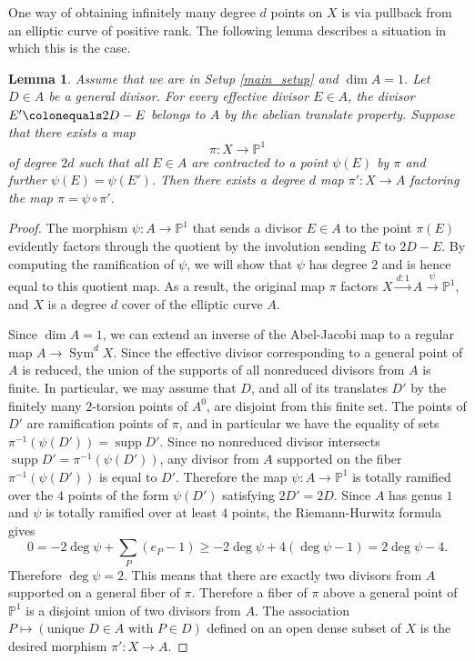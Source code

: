 \documentclass[11pt]{amsart}
\newcommand{\PP}{\mathbb{P}}
\newcommand{\pp}{\mathbb{P}}
\DeclareMathOperator{\supp}{supp}
\DeclareMathOperator{\Sym}{Sym}
\newtheorem{lemma}[theorem]{Lemma}
\theoremstyle{definition}
\theoremstyle{remark}
\begin{document}
One way of obtaining infinitely many degree \(d\) points on \(X\) is via pullback from an elliptic curve of positive rank.  The following lemma describes a situation in which this is the case.

\begin{lemma}\label{lem:ramification_argument}
Assume that we are in Setup \ref{main_setup} and \(\dim A = 1\).  Let \(D \in A\) be a general divisor.  For every effective divisor $E \in A$, the divisor $E' \colonequals 2D-E$ belongs to $A$ by the abelian translate property. Suppose that there exists a map
\[\pi \colon X \to \pp^1\]
of degree \(2d\) such that all \(E \in A\) are contracted to a point \(\psi(E)\) by \(\pi\) and further \(\psi(E) = \psi(E')\).  Then there exists a degree \(d\) map \(\pi'\colon X \to A\) factoring the map \(\pi = \psi \circ \pi'\).
\end{lemma}
\begin{proof}
The morphism $\psi \colon A  \to \pp^1$ that sends a divisor $E \in A$ to the point $\pi(E)$ evidently factors through the quotient by the involution sending \(E\) to \(2D - E\).  By computing the ramification of \(\psi\), we will show that \(\psi\) has degree \(2\) and is hence equal to this quotient map.  As a result, the original map \(\pi\) factors \(X \xrightarrow{d:1} A \xrightarrow{\psi} \pp^1\), and \(X\) is a degree \(d\) cover of the elliptic curve \(A\).

Since \(\dim A = 1\), we can extend an inverse of the Abel-Jacobi map to a regular map \(A \to \Sym^dX\).  Since the effective divisor corresponding to a general point of \(A\) is reduced, the union of the supports of all nonreduced divisors from \(A\) is finite.  In particular, we may assume that \(D\), and all of its translates \(D'\) by the finitely many \(2\)-torsion points of \(A^0\), are disjoint from this finite set. 
The points of $D'$ are ramification points of $\pi$, and in particular we have the equality of sets $\pi^{-1}(\psi(D'))=\supp D'$. Since no nonreduced divisor intersects $\supp D' = \pi^{-1}(\psi(D'))$, any divisor from \(A\) supported on the fiber $\pi^{-1}(\psi(D'))$ is equal to $D'$. Therefore the map $\psi \colon A \to \pp^1$ is totally ramified over the $4$ points of the form $\psi(D')$ satisfying $2D'=2D$. Since $A$ has genus $1$ and $\psi$ is totally ramified over at least $4$ points, the Riemann-Hurwitz formula gives
    \[0=-2 \deg \psi + \sum_P (e_P -1) \geqslant -2 \deg \psi + 4(\deg \psi -1)=2 \deg \psi - 4.\]
    Therefore $\deg \psi =2$. This means that there are exactly two divisors from $A$ supported on a general fiber of $\pi$. Therefore a fiber of $\pi$ above a general point of $\PP^1$ is a disjoint union of two divisors from $A$. The association $P \mapsto (\text{unique } D \in A\text{ with } P\in D)$ defined on an open dense subset of $X$ is the desired morphism $\pi':X \to A$.
\end{proof}
\end{document}
